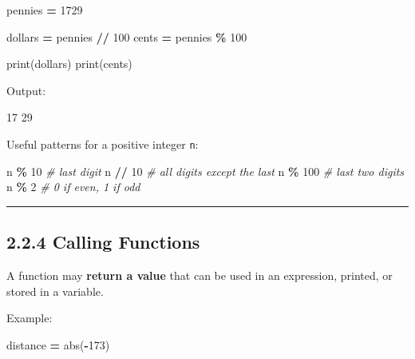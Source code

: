 \documentclass[
]{article}
\newenvironment{Shaded}{\begin{snugshade}}{\end{snugshade}}
\newcommand{\BuiltInTok}[1]{#1}
\newcommand{\CommentTok}[1]{\textcolor[rgb]{0.56,0.35,0.01}{\textit{#1}}}
\newcommand{\DecValTok}[1]{\textcolor[rgb]{0.00,0.00,0.81}{#1}}
\newcommand{\NormalTok}[1]{#1}
\newcommand{\OperatorTok}[1]{\textcolor[rgb]{0.81,0.36,0.00}{\textbf{#1}}}
\begin{document}
\begin{Shaded}
\begin{Highlighting}[]
\NormalTok{pennies }\OperatorTok{=} \DecValTok{1729}

\NormalTok{dollars }\OperatorTok{=}\NormalTok{ pennies }\OperatorTok{//} \DecValTok{100}
\NormalTok{cents }\OperatorTok{=}\NormalTok{ pennies }\OperatorTok{\%} \DecValTok{100}

\BuiltInTok{print}\NormalTok{(dollars)}
\BuiltInTok{print}\NormalTok{(cents)}
\end{Highlighting}
\end{Shaded}

Output:

\begin{Shaded}
\begin{Highlighting}[]
\NormalTok{17}
\NormalTok{29}
\end{Highlighting}
\end{Shaded}

Useful patterns for a positive integer \texttt{n}:

\begin{Shaded}
\begin{Highlighting}[]
\NormalTok{n }\OperatorTok{\%} \DecValTok{10}       \CommentTok{\# last digit}
\NormalTok{n }\OperatorTok{//} \DecValTok{10}      \CommentTok{\# all digits except the last}
\NormalTok{n }\OperatorTok{\%} \DecValTok{100}      \CommentTok{\# last two digits}
\NormalTok{n }\OperatorTok{\%} \DecValTok{2}        \CommentTok{\# 0 if even, 1 if odd}
\end{Highlighting}
\end{Shaded}

\begin{center}\rule{0.5\linewidth}{0.5pt}\end{center}

\subsection{2.2.4 Calling Functions}\label{calling-functions}

A function may \textbf{return a value} that can be used in an
expression, printed, or stored in a variable.

Example:

\begin{Shaded}
\begin{Highlighting}[]
\NormalTok{distance }\OperatorTok{=} \BuiltInTok{abs}\NormalTok{(}\OperatorTok{{-}}\DecValTok{173}\NormalTok{)}
\end{Highlighting}
\end{Shaded}
\end{document}
